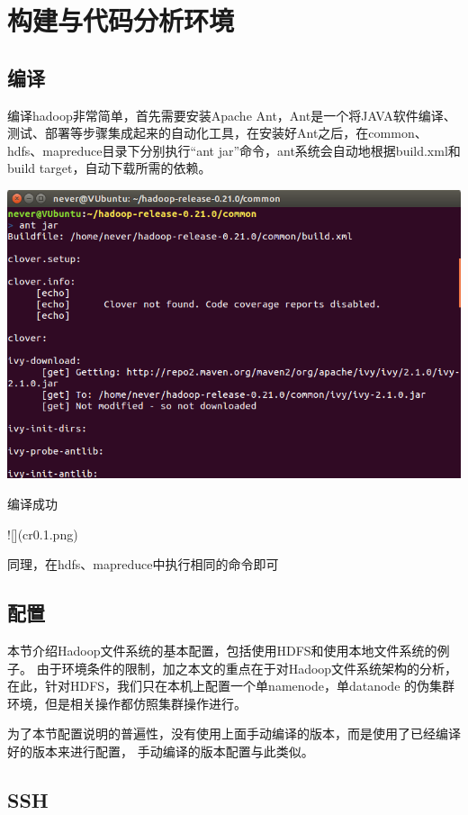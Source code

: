 \chapter{构建与代码分析环境}
\label{ch:env}
\section{编译}


编译hadoop非常简单，首先需要安装Apache Ant，Ant是一个将JAVA软件编译、测试、部署等步骤集成起来的自动化工具，在安装好Ant之后，在common、hdfs、mapreduce目录下分别执行``ant jar''命令，ant系统会自动地根据build.xml和build target，自动下载所需的依赖。

\includegraphics[width=\textwidth]{image/env/cr0.png}

编译成功

![](cr0.1.png)

同理，在hdfs、mapreduce中执行相同的命令即可


\section{配置}

本节介绍Hadoop文件系统的基本配置，包括使用HDFS和使用本地文件系统的例子。
由于环境条件的限制，加之本文的重点在于对Hadoop文件系统架构的分析，
在此，针对HDFS，我们只在本机上配置一个单namenode，单datanode
的伪集群环境，但是相关操作都仿照集群操作进行。

为了本节配置说明的普遍性，没有使用上面手动编译的版本，而是使用了已经编译好的版本来进行配置，
手动编译的版本配置与此类似。

\section{SSH}

